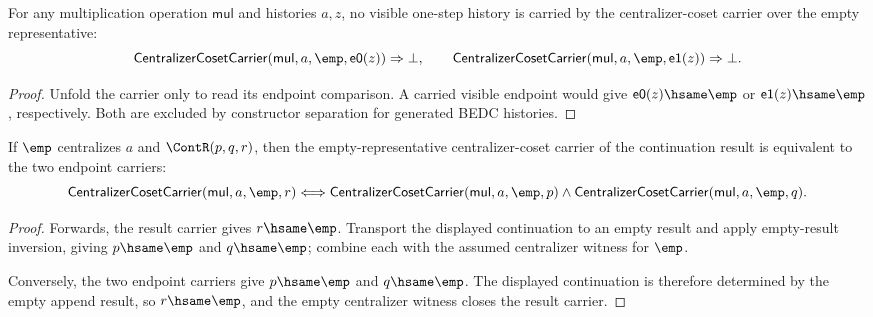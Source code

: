 \begin{theorem}
\label{thm:quotientgroup-centralizer-coset-empty-representative-visible-absurd}
For any multiplication operation $\mathsf{mul}$ and histories $a,z$, no visible
one-step history is carried by the centralizer-coset carrier over the empty
representative:
$$
\mathsf{CentralizerCosetCarrier}(\mathsf{mul},a,\emp,\mathsf{e0}(z))
\Rightarrow \bot,
\qquad
\mathsf{CentralizerCosetCarrier}(\mathsf{mul},a,\emp,\mathsf{e1}(z))
\Rightarrow \bot.
$$
\end{theorem}
\begin{proof}
Unfold the carrier only to read its endpoint comparison. A carried visible
endpoint would give $\mathsf{e0}(z)\hsame\emp$ or $\mathsf{e1}(z)\hsame\emp$,
respectively. Both are excluded by constructor separation for generated BEDC
histories.
\end{proof}

\begin{theorem}
\label{thm:quotientgroup-centralizer-coset-empty-continuation-pair}
If $\emp$ centralizes $a$ and $\ContR(p,q,r)$, then the empty-representative
centralizer-coset carrier of the continuation result is equivalent to the two
endpoint carriers:
$$
\mathsf{CentralizerCosetCarrier}(\mathsf{mul},a,\emp,r)
\Longleftrightarrow
\mathsf{CentralizerCosetCarrier}(\mathsf{mul},a,\emp,p)
\wedge
\mathsf{CentralizerCosetCarrier}(\mathsf{mul},a,\emp,q).
$$
\end{theorem}
\begin{proof}
Forwards, the result carrier gives $r\hsame\emp$. Transport the displayed
continuation to an empty result and apply empty-result inversion, giving
$p\hsame\emp$ and $q\hsame\emp$; combine each with the assumed centralizer
witness for $\emp$.

Conversely, the two endpoint carriers give $p\hsame\emp$ and $q\hsame\emp$.
The displayed continuation is therefore determined by the empty append result,
so $r\hsame\emp$, and the empty centralizer witness closes the result carrier.
\end{proof}

